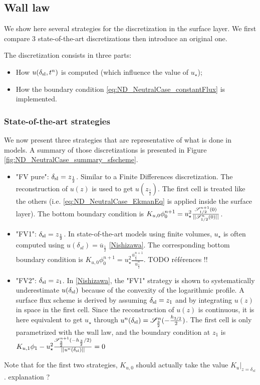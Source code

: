 \subsection{Wall law}
We show here several strategies for the discretization
in the surface layer. We first compare 3 state-of-the-art
discretizations then introduce an original one.

The discretization consists in three parts:
\begin{itemize}
	\item How $u(\delta_{\rm sl}, t^n)$ is computed
		(which influence the value of $u_\star$);
	\item How the boundary condition 
		\eqref{eq:ND_NeutralCase_constantFlux} is implemented.
\end{itemize}
\subsubsection{State-of-the-art strategies}
  We now present three strategies that are representative of
  what is done in models. A summary of those discretizations
  is presented in Figure \ref{fig:ND_NeutralCase_summary_sfscheme}.
  \begin{itemize}
	  \item "FV pure": $\delta_{\rm sl} = z_{\frac{1}{2}}$. Similar to a Finite Differences discretization.
	    The reconstruction of $u(z)$ is used to get 
		  $u(z_{\frac{1}{2}})$.
		  The first cell is treated like the others
		  (i.e. \eqref{eq:ND_NeutralCase_EkmanEq} is
		  applied inside the surface layer).
	The bottom boundary condition is 
		  $ K_{u,0} \phi_0^{n+1} = u_\star^2 
		  \frac{{\cal S}_{1/2}^{n+1}(0)}{||{\cal S}_{1/2}^n(0)||}$.
	  \item "FV1": $\delta_{\rm sl} = z_{\frac{1}{2}}$.
		  In state-of-the-art models using finite volumes,
		  $u_{\star}$ is often computed using
		  $u(\delta_{sl}) = \overline{u}_{\frac{1}{2}}$
		\ref{Nishizawa}.
		The corresponding bottom boundary condition is
		$ K_{u,0} \phi_0^{n+1} = u_\star^2 
		  \frac{\overline{u}^{n+1}_{\frac{1}{2}}}
		  	{\overline{u}_{\frac{1}{2}}^n}$.
			{\color{red} TODO références !!}

    \item "FV2":  $\delta_{\rm sl} = z_{1}$. In
    \ref{Nishizawa}, the "FV1" strategy is shown to systematically
	  underestimate $u(\delta_{\rm sl})$ because of the 
	  convexity of the logarithmic profile.
	A surface flux scheme is derived by assuming
	  $\delta_{\rm sl} = z_1$ and by integrating $u(z)$
	  in space in the first cell. Since the reconstruction
	  of $u(z)$ is continuous, it is here equivalent to
	  get $u_\star$ through
	  $u^n(\delta_{\rm sl}) = {\cal S}^n_{\frac{3}{2}}(
	  -\frac{h_{3/2}}{2})$. The first cell is only
	  parametrized with the wall law, and the boundary condition
		  at $z_1$ is $K_{u,1} \phi_1 - u_\star^2 
		  \frac{{\cal S}_{\frac{3}{2}}^{n+1}
		  	(-h_{\frac{3}{2}}/2)}
		  {||u^n(\delta_{\rm sl})||} = 0$
	  
  \end{itemize}
  Note that for the first two strategies, $K_{u,0}$ should actually
  take the value $\left. K_{u}\right|_{z=\delta_{sl}}$.
  {\color{red} explanation ?}

